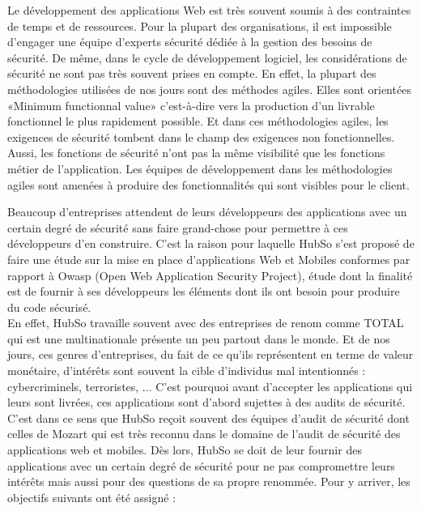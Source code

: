 \begin{itemize}
	\itemtirait Le développement des applications Web est très souvent soumis à des contraintes de temps et de ressources. Pour la plupart des organisations, il est impossible d’engager une équipe d’experts sécurité dédiée à la gestion des besoins de sécurité. De même, dans le cycle de développement logiciel, les considérations de sécurité ne sont pas très souvent prises en compte. En effet, la plupart des méthodologies utilisées de nos jours sont des méthodes agiles. Elles sont orientées «Minimum functionnal value» c'est-à-dire vers la production d'un livrable fonctionnel le plus rapidement possible. Et dans ces méthodologies agiles, les exigences de sécurité tombent dans le champ des exigences non fonctionnelles. Aussi, les fonctions de sécurité n’ont pas la même visibilité que les fonctions métier de l’application. Les équipes de développement dans les méthodologies agiles sont amenées à produire des fonctionnalités qui sont visibles pour le client.
\end{itemize}
Beaucoup d’entreprises attendent de leurs développeurs des applications avec un certain degré de sécurité sans faire grand-chose pour permettre à ces développeurs d’en construire. C'est la raison pour laquelle HubSo s'est proposé de faire une étude sur la mise en place d'applications Web et Mobiles conformes par rapport à Owasp (Open Web Application Security Project),  étude dont la finalité est de fournir à ses développeurs les éléments dont ils ont besoin pour produire du code sécurisé. \\
En effet, HubSo travaille souvent avec des entreprises de renom comme TOTAL qui est une multinationale présente un peu partout dans le monde. Et de nos jours, ces genres d'entreprises, du fait de ce qu'ils représentent en terme de valeur monétaire, d'intérêts sont souvent la cible d'individus mal intentionnés : cybercriminels, terroristes, ... C'est pourquoi avant d'accepter les applications qui leurs sont livrées, ces applications sont d'abord sujettes à des audits de sécurité. C'est dans ce sens que HubSo reçoit souvent des équipes d'audit de sécurité dont celles de Mozart qui est très reconnu dans le domaine de l'audit de sécurité des applications web et mobiles. Dès lors, HubSo se doit de leur fournir des applications avec un certain degré de sécurité pour ne pas compromettre leurs intérêts mais aussi pour des questions de sa propre renommée.
Pour y arriver, les objectifs suivants ont été assigné :
